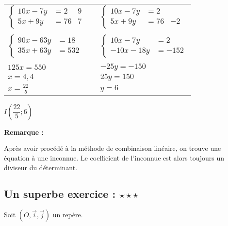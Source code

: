 \begin{tabular}{lcl}
$\left\{ \begin{array}{ll|l} 
10x -7y &=2 &9 \\
  5x +9y &=76 & 7
\end{array} \right. $ & \hspace{1cm} & $\left\{ \begin{array}{ll|l} 
10x -7y &=2 & \\
  5x +9y &=76 & -2
\end{array} \right. $ \\
   & & \\
$\left\{ \begin{array}{ll} 
90x -63y &=18  \\
  35x +63y &=532 
\end{array} \right. $ & \hspace{1cm} & $\left\{ \begin{array}{ll} 
10x -7y &=2  \\
  -10x -18y &=-152
\end{array} \right. $ \\
\cline{1-1} \cline{3-3}\\
$125x = 550$ & & $-25y=-150 $\\
$ x = 4,4$   & & $25y=150$ \\
$x = \frac{22}{5}$ & & $y=6$ \\
\end{tabular}

\vspace{.5cm}

$I\left(\dfrac{22}{5}; 6\right)$ 

\vspace{.5cm}

\textbf{Remarque :}

Après avoir procédé à la méthode de combinaison linéaire, on trouve une équation à une inconnue. Le coefficient de l'inconnue est alors toujours un diviseur du déterminant.

\newpage

\subsection*{Un superbe exercice : $\star \star \star$ } 

Soit $(O,\vec{i},\vec{j})$ un repère.

\vspace{.1cm}

